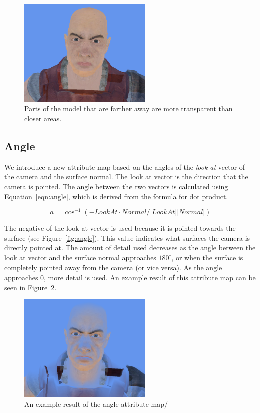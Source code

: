 \documentclass[annual]{acmsiggraph}
\begin{document}
\begin{figure}[h]
	\centering
	\includegraphics[width=2.5in]{images/distance_result}
	\caption{Parts of the model that are farther away are more transparent than closer areas.}
	\label{fig:distanceResult}
\end{figure}

\subsection{Angle}
\label{sec:angle}
We introduce a new attribute map based on the angles of the {\it{look at}} vector of the camera and the surface normal. The look at vector is the direction that the camera is pointed. The angle between the two vectors is calculated using Equation~\ref{eqn:angle}, which is derived from the formula for dot product.

\begin{equation}
\label{eqn:angle}
a = \cos^{-1}{(-LookAt \cdot Normal / |LookAt||Normal|)}
\end{equation}

The negative of the look at vector is used because it is pointed towards the surface (see Figure~\ref{fig:angle}). This value indicates what surfaces the camera is directly pointed at. The amount of detail used decreases as the angle between the look at vector and the surface normal approaches $180^\circ$, or when the surface is completely pointed away from the camera (or vice versa). As the angle approaches 0, more detail is used. An example result of this attribute map can be seen in Figure~\ref{fig:angleResult}.

\begin{figure}[h]
	\centering
	\includegraphics[width=2.5in]{images/angle_result}
	\caption{An example result of the angle attribute map/}
	\label{fig:angleResult}
\end{figure}
\end{document}
